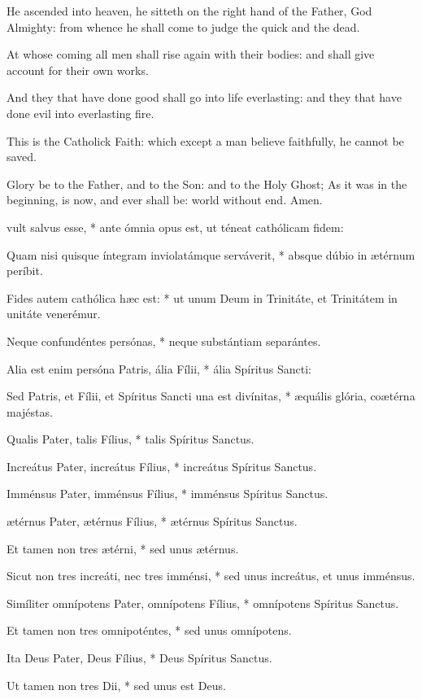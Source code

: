 {He ascended into heaven, he sitteth on the right hand of the Father, God Almighty: from whence he shall come to judge the quick and the dead.\par
At whose coming all men shall rise again with their bodies: and shall give account for their own works.\par
And they that have done good shall go into life everlasting: and they that have done evil into everlasting fire.
\par
This is the Catholick Faith: which except a man believe faithfully, he cannot be saved.\par
\par
Glory be to the Father, and to the Son: and to the Holy Ghost;
As it was in the beginning, is now, and ever shall be: world without end. Amen.
}
{ vult salvus esse, * ante ómnia opus est, ut téneat cathólicam fidem:\par
Quam nisi quisque íntegram inviolatámque serváverit, * absque dúbio in {\ae}térnum períbit.
\par
Fides autem cathólica h{\ae}c est: * ut unum Deum in Trinitáte, et Trinitátem in unitáte venerémur.\par
Neque confundéntes persónas, * neque substántiam separántes.\par
Alia est enim persóna Patris, ália Fílii, * ália Spíritus Sancti:\par
Sed Patris, et Fílii, et Spíritus Sancti una est divínitas, * {\ae}quális glória, co{\ae}térna majéstas.\par
Qualis Pater, talis Fílius, * talis Spíritus Sanctus.\par
Increátus Pater, increátus Fílius, * increátus Spíritus Sanctus.\par
Imménsus Pater, imménsus Fílius, * imménsus Spíritus Sanctus.\par
{\ae}térnus Pater, {\ae}térnus Fílius, * {\ae}térnus Spíritus Sanctus.\par
Et tamen non tres {\ae}térni, * sed unus {\ae}térnus.\par
Sicut non tres increáti, nec tres imménsi, * sed unus increátus, et unus imménsus.\par
Simíliter omnípotens Pater, omnípotens Fílius, * omnípotens Spíritus Sanctus.\par
Et tamen non tres omnipoténtes, * sed unus omnípotens.\par
Ita Deus Pater, Deus Fílius, * Deus Spíritus Sanctus.\par
Ut tamen non tres Dii, * sed unus est Deus.\par
}
